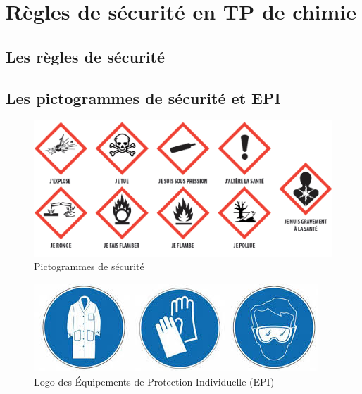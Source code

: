 \section{Règles de sécurité en TP de chimie}
\subsection{Les règles de sécurité}
\begin{tcolorbox}[colback=red!5!white,colframe=red!75!black,title=\textbf{En TP de chimie :}]
\vspace{10cm}
\end{tcolorbox}

\subsection{Les pictogrammes de sécurité et EPI}
\begin{figure}[!h]
    \centering
    \includegraphics[scale=1]{Cours/Pictogrammes.png}
    \caption{Pictogrammes de sécurité}
    \label{fig:enter-label}
\end{figure}

\begin{figure}[!h]
    \centering
    \includegraphics[scale=0.9]{Cours/picto_gant_blouse_lunette.jpg}
    \caption{Logo des \'{E}quipements de Protection Individuelle (EPI)}
    \label{fig:enter-label}
\end{figure}


